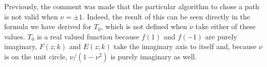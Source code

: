 Previously, the comment was made that the particular algorithm to chose a path is not valid when $ν = \pm 1$. Indeed, the result of this can be seen directly in the formula we have derived for $T_0$, which is not defined when $ν$ take either of these values. $T_0$ is a real valued function because $f(1)$ and $f(-1)$ are purely imaginary, $F(z;k)$ and $E(z;k)$ take the imaginary axis to itself and, because $ν$ is on the unit circle, $ν/(1-ν^2)$ is purely imaginary as well.

%
%







